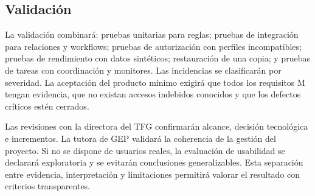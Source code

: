 \subsection{Validación}\label{sec:1-4-3}

La validación combinará: pruebas unitarias para reglas; pruebas de integración para relaciones y workflows; pruebas de autorización con perfiles incompatibles; pruebas de rendimiento con datos sintéticos; restauración de una copia; y pruebas de tareas con coordinación y monitores. Las incidencias se clasificarán por severidad. La aceptación del producto mínimo exigirá que todos los requisitos M tengan evidencia, que no existan accesos indebidos conocidos y que los defectos críticos estén cerrados.

Las revisiones con la directora del TFG confirmarán alcance, decisión tecnológica e incrementos. La tutora de GEP validará la coherencia de la gestión del proyecto. Si no se dispone de usuarios reales, la evaluación de usabilidad se declarará exploratoria y se evitarán conclusiones generalizables. Esta separación entre evidencia, interpretación y limitaciones permitirá valorar el resultado con criterios transparentes.

